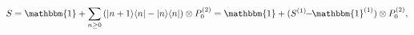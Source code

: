 \begin{equation}\label{shift1}
 S=\mathbbm{1}+\sum_{n\geq 0}\,(|n+1\rangle\langle n|-
 |n\rangle\langle n|) \otimes P^{(2)}_0=\mathbbm{1}+
 (S^{(1)}\!\!-\!\!\mathbbm{1}^{(1)})\otimes P_0^{(2)},
\end{equation}

